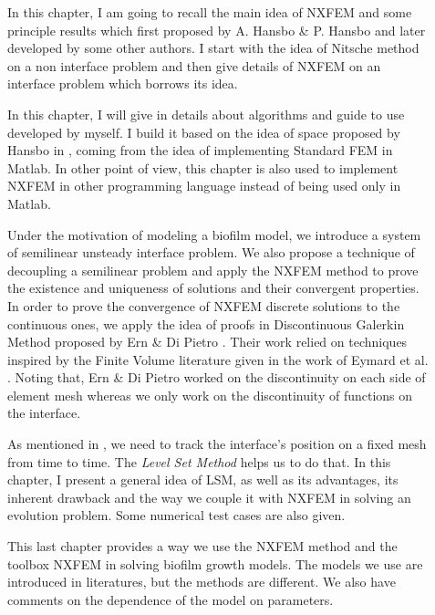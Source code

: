 \documentclass[../main.tex]{subfiles}
\begin{document}
\begin{description}
\item[] In this chapter, I am going to recall the main idea of NXFEM and some principle results which first proposed by A. Hansbo \& P. Hansbo \cite{Hansbo2002} and later developed by some other authors. I start with the idea of Nitsche method on a non interface problem and then give details of NXFEM on an interface problem which borrows its idea. \medskip
\item[] In this chapter, I will give in details about algorithms and guide to use  developed by myself. I build it based on the idea of space proposed by Hansbo in , coming from the idea of implementing Standard FEM in Matlab. In other point of view, this chapter is also used to implement NXFEM in other programming language instead of being used only in Matlab. \medskip
\item[] Under the motivation of modeling a biofilm model, we introduce a system of semilinear unsteady interface problem. We also propose a technique of decoupling a semilinear problem and apply the NXFEM method to prove the existence and uniqueness of solutions and their convergent properties. In order to prove the convergence of NXFEM discrete solutions to the continuous ones, we apply the idea of proofs in Discontinuous Galerkin Method proposed by Ern \& Di Pietro \cite{DiPietro2010}. Their work relied on techniques inspired by the Finite Volume literature given in the work of Eymard et al. \cite{Eymard2008}. Noting that, Ern \& Di Pietro worked on the discontinuity on each side of element mesh whereas we only work on the discontinuity of functions on the interface.\medskip
\item[] As mentioned in , we need to track the interface's position on a fixed mesh from time to time. The \textit{Level Set Method} helps us to do that. In this chapter, I present a general idea of LSM, as well as its advantages, its inherent drawback and the way we couple it with NXFEM in solving an evolution problem. Some numerical test cases are also given. \medskip
\item[] This last chapter provides a way we use the NXFEM method and the toolbox NXFEM in solving biofilm growth models. The models we use are introduced in literatures, but the methods are different. We also have comments on the dependence of the model on parameters.
\end{description}
\end{document}
